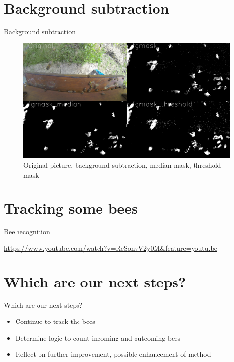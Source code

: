 \documentclass{beamer}
\begin{document}
\section{Background subtraction}
\begin{frame}{Background subtraction}
\begin{figure}
\includegraphics[scale=0.23]{pictures/backg2}
\caption{Original picture, background subtraction, median mask, threshold mask}
\end{figure}
\end{frame}

\section{Tracking some bees}
\begin{frame}{Bee recognition}

\centering 
\url{https://www.youtube.com/watch?v=ReSonvV2y0M&feature=youtu.be}
\end{frame}

\section{Which are our next steps?}
\begin{frame}{Which are our next steps?}
\begin{itemize}
\item Continue to track the bees
\item Determine logic to count incoming and outcoming bees
\item Reflect on further improvement, possible enhancement of method
\end{itemize}
\end{frame}
\end{document}
